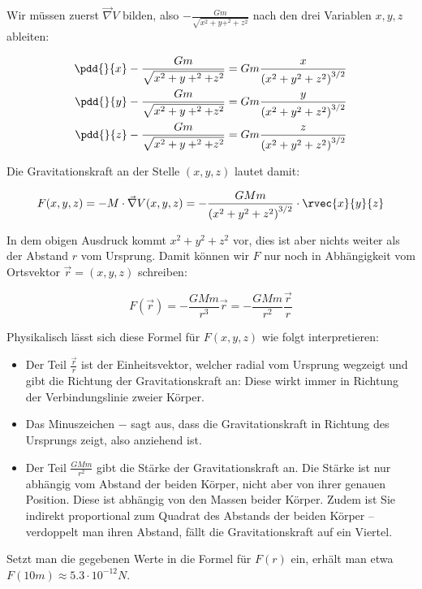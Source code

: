 \item Wir müssen zuerst $\vec{\nabla} V$ bilden, also $-\frac{G m}{\sqrt{x^2+y+^2+z^2}}$ nach den drei Variablen $x,y,z$ ableiten:

\begin{alignat*}{1}
	\pdd{}{x} - \frac{G m}{\sqrt{x^2+y+^2+z^2}} &= Gm \frac{x}{\left(x^2+y^2+z^2\right)^{3/2}} \\
	\pdd{}{y} - \frac{G m}{\sqrt{x^2+y+^2+z^2}} &= Gm \frac{y}{\left(x^2+y^2+z^2\right)^{3/2}} \\
	\pdd{}{z} - \frac{G m}{\sqrt{x^2+y+^2+z^2}} &= Gm \frac{z}{\left(x^2+y^2+z^2\right)^{3/2}}
\end{alignat*}

Die Gravitationskraft an der Stelle $(x,y,z)$ lautet damit:

$$
	F(x,y,z)= -M \cdot \vec{\nabla} V(x,y,z) = -\frac{GMm}{\left(x^2+y^2+z^2\right)^{3/2}} \cdot \rvec{x}{y}{z}
$$

In dem obigen Ausdruck kommt $x^2+y^2+z^2$ vor, dies ist aber nichts weiter als der Abstand $r$ vom Ursprung. Damit können wir $F$ nur noch in Abhängigkeit vom Ortsvektor $\vec{r}=(x,y,z)$ schreiben:

$$
	F(\vec{r}) = -\frac{GMm}{r^3} \vec{r} = - \frac{GMm}{r^2} \frac{\vec{r}}{r}
$$

Physikalisch lässt sich diese Formel für $F(x,y,z)$ wie folgt interpretieren:

\begin{itemize}
	\item Der Teil $\frac{\vec{r}}{r}$ ist der Einheitsvektor, welcher radial vom Ursprung wegzeigt und gibt die Richtung der Gravitationskraft an: Diese wirkt immer in Richtung der Verbindungslinie zweier Körper.
	\item Das Minuszeichen $-$ sagt aus, dass die Gravitationskraft in Richtung des Ursprungs zeigt, also anziehend ist.
	\item Der Teil $\frac{GMm}{r^2}$ gibt die Stärke der Gravitationskraft an. Die Stärke ist nur abhängig vom Abstand der beiden Körper, nicht aber von ihrer genauen Position. Diese ist abhängig von den Massen beider Körper. Zudem ist Sie indirekt proportional zum Quadrat des Abstands der beiden Körper -- verdoppelt man ihren Abstand, fällt die Gravitationskraft auf ein Viertel.
\end{itemize}

Setzt man die gegebenen Werte in die Formel für $F(r)$ ein, erhält man etwa $F(10m) \approx 5.3\cdot 10^{-12} N$.